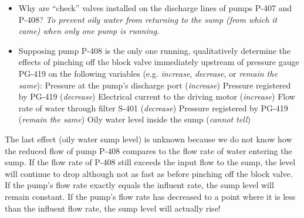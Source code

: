 \begin{itemize}
\item{} Why are ``check'' valves installed on the discharge lines of pumps P-407 and P-408? {\it To prevent oily water from returning to the sump (from which it came) when only one pump is running.}
\vskip 10pt
\item{} Supposing pump P-408 is the only one running, qualitatively determine the effects of pinching off the block valve immediately upstream of pressure gauge PG-419 on the following variables (e.g. {\it increase}, {\it decrease}, or {\it remain the same}):
\itemitem{} Pressure at the pump's discharge port ({\it increase})
\itemitem{} Pressure registered by PG-419 ({\it decrease})
\itemitem{} Electrical current to the driving motor ({\it increase})
\itemitem{} Flow rate of water through filter S-401 ({\it decrease})
\itemitem{} Pressure registered by PG-419 ({\it remain the same})
\itemitem{} Oily water level inside the sump ({\it cannot tell})
\end{itemize}

The last effect (oily water sump level) is unknown because we do not know how the reduced flow of pump P-408 compares to the flow rate of water entering the sump.  If the flow rate of P-408 still exceeds the input flow to the sump, the level will continue to drop although not as fast as before pinching off the block valve.  If the pump's flow rate exactly equals the influent rate, the sump level will remain constant.  If the pump's flow rate has decreased to a point where it is less than the influent flow rate, the sump level will actually rise!











